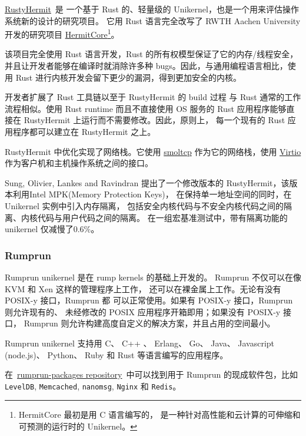 \documentclass{../runikraft-report}
\begin{document}
\href{https://github.com/hermitcore/rusty-hermit}{RustyHermit}\ 是
一个基于 Rust 的、轻量级的 Unikernel，也是一个用来评估操作系统新的设计的研究项目。
它用 Rust 语言完全改写了 RWTH Aachen University
开发的研究项目 \href{http://hermitcore.org/}{HermitCore}\footnote{HermitCore 最初是用 C 语言编写的，
是一种针对高性能和云计算的可伸缩和可预测的运行时的 Unikernel。}。\cite{bib:14-rusty-hermit}

该项目完全使用 Rust 语言开发，Rust 的所有权模型保证了它的内存/线程安全，
并且让开发者能够在编译时就消除许多种 bugs。因此，与通用编程语言相比，使用 Rust
进行内核开发会留下更少的漏洞，得到更加安全的内核。

开发者扩展了 Rust 工具链以至于 RustyHermit 的 build 过程
与 Rust 通常的工作流程相似。使用 Rust runtime 而且不直接使用 OS 服务的
Rust 应用程序能够直接在 RustyHermit 上运行而不需要修改。因此，原则上，
每一个现有的 Rust 应用程序都可以建立在 RustyHermit 之上。\cite{bib:17-rusty-hermit2}


RustyHermit 中优化实现了网络栈。它使用 \href{https://github.com/smoltcp-rs/smoltcp}{smoltcp}
作为它的网络栈，使用 \href{https://www.linux-kvm.org/page/Virtio}{Virtio}
作为客户机和主机操作系统之间的接口。

Sung, Olivier, Lankes and Ravindran\cite{bib:18-intra-unikernel}
提出了一个修改版本的 RustyHermit，该版本利用Intel MPK(Memory Protection Keys)\cite{bib:19-mpk}，
在保持单一地址空间的同时，在 Unikernel 实例中引入内存隔离，
包括安全内核代码与不安全内核代码之间的隔离、内核代码与用户代码之间的隔离。
在一组宏基准测试中，带有隔离功能的 unikernel 仅减慢了0.6\%。

\subsubsection{Rumprun}

Rumprun unikernel 是在 rump kernels 的基础上开发的。
Rumprun 不仅可以在像 KVM 和 Xen 这样的管理程序上工作，
还可以在裸金属上工作。无论有没有 POSIX-y 接口，Rumprun 都
可以正常使用。如果有 POSIX-y 接口，Rumprun 则允许现有的、
未经修改的 POSIX 应用程序开箱即用；如果没有 POSIX-y 接口，
Rumprun 则允许构建高度自定义的解决方案，并且占用的空间最小。

Rumprun unikernel 支持用 C、 C++ 、 Erlang、 Go、
Java、 Javascript (node.js)、 Python、 Ruby 和 Rust 等语言编写的应用程序。

在\ \href{https://github.com/rumpkernel/rumprun-packages}{rumprun-packages repository}\
中可以找到用于 Rumprun 的现成软件包，比如 \texttt{LevelDB},
\texttt{Memcached}, \texttt{nanomsg}, \texttt{Nginx} 和 \texttt{Redis}。
\end{document}
